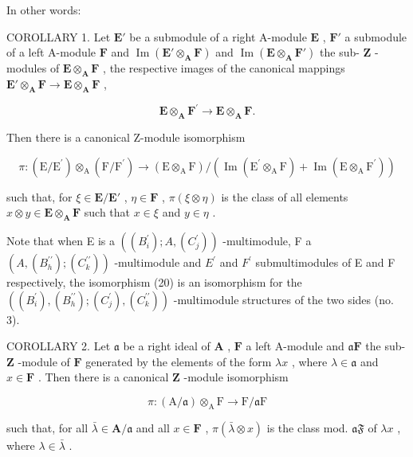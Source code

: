 In other words:

COROLLARY 1. Let \(\mathbf{E}'\) be a submodule of a right A-module \(\mathbf{E}\) , \(\mathbf{F}'\) a submodule of a left A-module \(\mathbf{F}\) and \(\operatorname{Im}(\mathbf{E}' \otimes_{\mathbf{A}} \mathbf{F})\) and \(\operatorname{Im}(\mathbf{E} \otimes_{\mathbf{A}} \mathbf{F}')\) the sub- \(\mathbf{Z}\) -modules of \(\mathbf{E} \otimes_{\mathbf{A}} \mathbf{F}\) , the respective images of the canonical mappings \(\mathbf{E}' \otimes_{\mathbf{A}} \mathbf{F} \to \mathbf{E} \otimes_{\mathbf{A}} \mathbf{F}\) ,

\[
\mathbf {E} \otimes_ {\mathbf {A}} \mathbf {F} ^ {\prime} \rightarrow \mathbf {E} \otimes_ {\mathbf {A}} \mathbf {F}.
\]

Then there is a canonical Z-module isomorphism

\[
\pi : (\mathrm{E} / \mathrm{E} ^ {\prime}) \otimes_ {\mathrm{A}} (\mathrm{F} / \mathrm{F} ^ {\prime}) \rightarrow (\mathrm{E} \otimes_ {\mathrm{A}} \mathrm{F}) / (\operatorname{Im} (\mathrm{E} ^ {\prime} \otimes_ {\mathrm{A}} \mathrm{F}) + \operatorname{Im} (\mathrm{E} \otimes_ {\mathrm{A}} \mathrm{F} ^ {\prime}))\tag{20}
\]

such that, for \(\xi \in \mathbf{E} / \mathbf{E}'\) , \(\eta \in \mathbf{F}\) , \(\pi (\xi \otimes \eta)\) is the class of all elements \(x \otimes y \in \mathbf{E} \otimes_{\mathbf{A}} \mathbf{F}\) such that \(x \in \xi\) and \(y \in \eta\) .

Note that when E is a \(((B_{i}^{\prime}); A, (C_{j}^{\prime}))\) -multimodule, F a \((A, (B_{h}^{\prime\prime}); (C_{k}^{\prime\prime}))\) -multimodule and \(E^{\prime}\) and \(F^{\prime}\) submultimodules of E and F respectively, the isomorphism (20) is an isomorphism for the \(((B_{i}^{\prime}), (B_{h}^{\prime\prime}); (C_{j}^{\prime}), (C_{k}^{\prime\prime}))\) -multimodule structures of the two sides (no. 3).

COROLLARY 2. Let \(\mathfrak{a}\) be a right ideal of \(\mathbf{A}\) , \(\mathbf{F}\) a left A-module and \(\mathfrak{a}\mathbf{F}\) the sub- \(\mathbf{Z}\) -module of \(\mathbf{F}\) generated by the elements of the form \(\lambda x\) , where \(\lambda \in \mathfrak{a}\) and \(x \in \mathbf{F}\) . Then there is a canonical \(\mathbf{Z}\) -module isomorphism

\[
\pi : (\mathrm{A} / \mathfrak {a}) \otimes_ {\mathrm{A}} \mathrm{F} \rightarrow \mathrm{F} / \mathfrak {a} \mathrm{F}\tag{21}
\]

such that, for all \(\bar{\lambda} \in \mathbf{A} / \mathfrak{a}\) and all \(x \in \mathbf{F}\) , \(\pi(\bar{\lambda} \otimes x)\) is the class mod. \(\mathfrak{aF}\) of \(\lambda x\) , where \(\lambda \in \bar{\lambda}\) .

